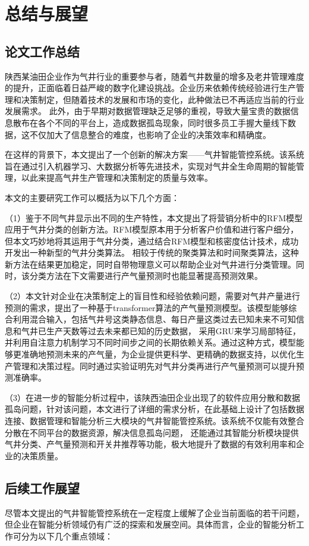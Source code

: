 \chapter{总结与展望}
\section{论文工作总结}
陕西某油田企业作为气井行业的重要参与者，随着气井数量的增多及老井管理难度的提升，正面临着日益严峻的数字化建设挑战。企业历来依赖传统经验进行生产管理和决策制定，但随着技术的发展和市场的变化，此种做法已不再适应当前的行业发展需求。
此外，由于早期对数据管理缺乏足够的重视，导致大量宝贵的数据信息散布在各个不同的平台上，造成数据孤岛现象，同时很多员工手握大量线下数据，这不仅加大了信息整合的难度，也影响了企业的决策效率和精确度。

在这样的背景下，本文提出了一个创新的解决方案——气井智能管控系统。该系统旨在通过引入机器学习、大数据分析等先进技术，实现对气井全生命周期的智能管理，以此来提高气井生产管理和决策制定的质量与效率。

本文的主要研究工作可以概括为以下几个方面：

（1）鉴于不同气井显示出不同的生产特性，本文提出了将营销分析中的RFM模型应用于气井分类的创新方法。RFM模型原本用于分析客户价值和进行客户细分，但本文巧妙地将其运用于气井分类，通过结合RFM模型和核密度估计技术，成功开发出一种新型的气井分类算法。
相较于传统的聚类算法和时间聚类算法，这种新方法在结果更加稳定，同时自带物理意义可以帮助企业对气井进行分类管理。同时，该分类方法在下文需要进行产气量预测时也能显著提高预测效果。

（2）本文针对企业在决策制定上的盲目性和经验依赖问题，需要对气井产量进行预测的需求，提出了一种基于transformer算法的产气量预测模型。该模型能够综合利用混合输入，包括气井号这类静态信息、每日产量这类过去已知未来不可知信息和气井已生产天数等过去未来都已知的历史数据，
采用GRU来学习局部特征，并利用自注意力机制学习不同时间步之间的长期依赖关系。通过这种方式，模型能够更准确地预测未来的产气量，为企业提供更科学、更精确的数据支持，以优化生产管理和决策过程。同时通过实验证明先对气井分类再进行产气量预测可以提升预测准确率。

（3）在进一步的智能分析过程中，该陕西油田企业出现了的软件应用分散和数据孤岛问题，针对该问题，本文进行了详细的需求分析，在此基础上设计了包括数据连接、数据管理和智能分析三大模块的气井智能管控系统。该系统不仅能有效整合分散在不同平台的数据资源，解决信息孤岛问题，
还能通过其智能分析模块提供
气井分类、产气量预测和开关井推荐等功能，极大地提升了数据的有效利用率和企业的决策质量。
\section{后续工作展望}
尽管本文提出的气井智能管控系统在一定程度上缓解了企业当前面临的若干问题，但企业在智能分析领域仍有广泛的探索和发展空间。具体而言，企业的智能分析工作可分为以下几个重点领域：

